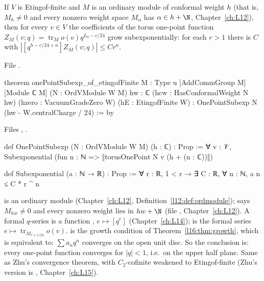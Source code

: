\begin{theorem}\label{l16:thm:growth}
If $V$ is Etingof-finite and $M$ is an ordinary module of conformal weight $h$ (that is, $M_h\ne0$ and every nonzero
weight space $M_\alpha$ has $\alpha\in h+\N$, Chapter~\ref{ch:L12}), then for every $v\in V$ the
coefficients of the torus one-point function $Z_M(v;q) = \operatorname{tr}_M o(v)q^{L_0-c/24}$ grow subexponentially:
for each $r>1$ there is $C$ with $|[q^{h-c/24+n}]Z_M(v;q)|\le C r^n$.
\end{theorem}
\noindent File .
\begin{leancode}
theorem onePointSubexp_of_etingofFinite {M : Type u} [AddCommGroup M] [Module ℂ M]
    (N : OrdVModule W M) {hw : ℂ} (hcw : HasConformalWeight N hw)
    (hzero : VacuumGradeZero W) (hE : EtingofFinite W) :
    OnePointSubexp N (hw - W.centralCharge / 24) := by
\end{leancode}
\noindent Files ,
.
\begin{leancode}
def OnePointSubexp (N : OrdVModule W M) (h : ℂ) : Prop :=
  ∀ v : 𝒱, Subexponential (fun n : ℕ => ‖torusOnePoint N v (h + (n : ℂ))‖)

def Subexponential (a : ℕ → ℝ) : Prop :=
  ∀ r : ℝ, 1 < r → ∃ C : ℝ, ∀ n : ℕ, a n ≤ C * r ^ n
\end{leancode}

\begin{dictionary}
 is an ordinary module (Chapter~\ref{ch:L12}, Definition~\ref{l12:def:ordmodule});
 says $M_{hw}\ne0$ and every nonzero weight lies in $hw+\N$
(file , Chapter~\ref{ch:L12}). A formal $q$-series is a
function , $e\mapsto[q^e]$ (Chapter~\ref{ch:L14});  is the
formal series $e\mapsto\operatorname{tr}_{M_{e+c/24}}o(v)$.  is the growth condition of
Theorem~\ref{l16:thm:growth}, which is equivalent to: $\sum a_nq^n$ converges on the open unit disc. So the
conclusion is: every one-point function converges for $|q|<1$, i.e.\ on the upper half plane. Same as Zhu's
convergence theorem, with $C_2$-cofinite weakened to Etingof-finite (Zhu's version is
, Chapter~\ref{ch:L15}).
\end{dictionary}

